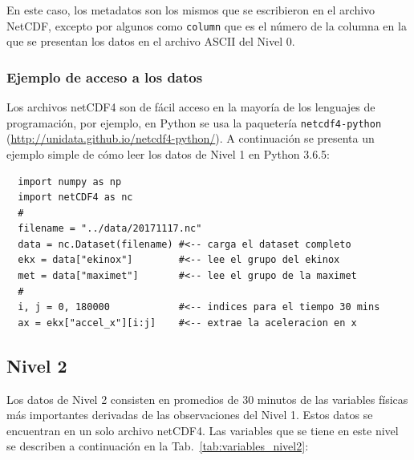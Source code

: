 \documentclass[11pt]{article}
\begin{document}
En este caso, los metadatos son los mismos que se escribieron en el archivo
NetCDF, excepto por algunos como \texttt{column} que es el número de la columna
en la que se presentan los datos en el archivo ASCII del Nivel 0.


\subsubsection*{Ejemplo de acceso a los datos}
\label{ssub:ejemplos_de_acceso_a_los_datos}

Los archivos netCDF4 son de fácil acceso en la mayoría de los lenguajes de
programación, por ejemplo, en Python se usa la paquetería
\texttt{netcdf4-python} (\url{http://unidata.github.io/netcdf4-python/}). A
continuación se presenta un ejemplo simple de cómo leer los datos de Nivel 1 en
Python 3.6.5:

\begin{verbatim}
  import numpy as np
  import netCDF4 as nc
  #
  filename = "../data/20171117.nc" 
  data = nc.Dataset(filename) #<-- carga el dataset completo
  ekx = data["ekinox"]        #<-- lee el grupo del ekinox
  met = data["maximet"]       #<-- lee el grupo de la maximet
  #
  i, j = 0, 180000            #<-- indices para el tiempo 30 mins
  ax = ekx["accel_x"][i:j]    #<-- extrae la aceleracion en x
\end{verbatim}




\subsection{Nivel 2}
\label{sub:nivel_2}

Los datos de Nivel 2 consisten en promedios de 30 minutos de las variables
físicas más importantes derivadas de las observaciones del Nivel 1. Estos datos
se encuentran en un solo archivo netCDF4. Las variables que se tiene en este
nivel se describen a continuación en la Tab.~\ref{tab:variables_nivel2}:
\end{document}
